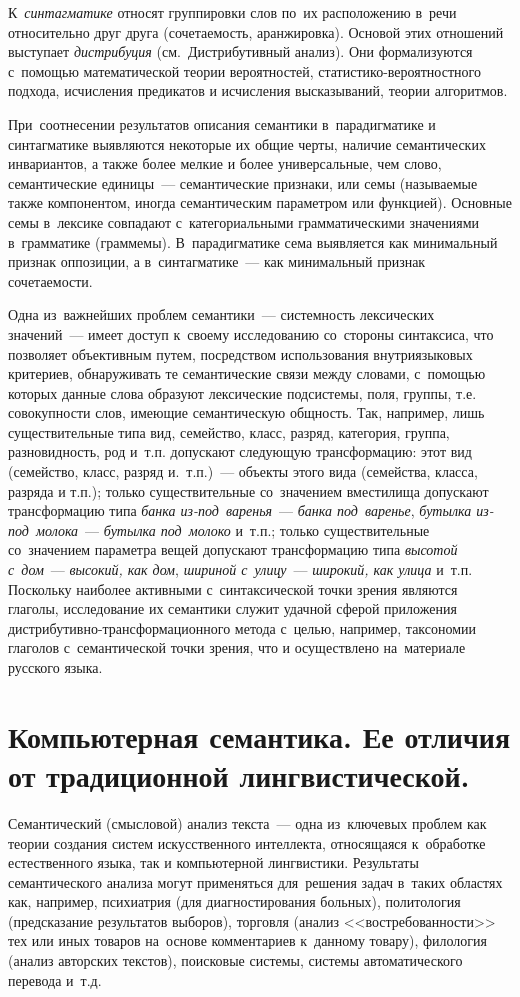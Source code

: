 \documentclass[12pt]{article}
\theoremstyle{definition}
\theoremstyle{remark}
\numberwithin{equation}{section}
\begin{document}
К~{\sl синтагматике} относят группировки слов по~их расположению в~речи 
относительно друг друга (сочетаемость, аранжировка). Основой этих отношений 
выступает {\sl дистрибуция} (см.~Дистрибутивный анализ). Они формализуются 
с~помощью математической теории вероятностей, статистико-вероятностного 
подхода, исчисления предикатов и исчисления высказываний, теории алгоритмов.

При~соотнесении результатов описания семантики в~парадигматике и синтагматике 
выявляются некоторые их общие черты, наличие семантических инвариантов, 
а также более мелкие и более универсальные, чем слово, семантические 
единицы~--- семантические признаки, или семы (называемые также компонентом, 
иногда семантическим параметром или функцией). Основные семы в~лексике совпадают 
с~категориальными грамматическими значениями в~грамматике (граммемы). 
В~парадигматике сема выявляется как минимальный признак оппозиции, 
а в~синтагматике~--- как минимальный признак сочетаемости.

Одна из~важнейших проблем семантики~--- системность лексических значений~--- 
имеет доступ к~своему исследованию со~стороны синтаксиса, что позволяет 
объективным путем, посредством использования внутриязыковых критериев, 
обнаруживать те семантические связи между словами, с~помощью которых данные 
слова образуют лексические подсистемы, поля, группы, т.е. совокупности 
слов, имеющие семантическую общность. Так, например, лишь существительные 
типа вид, семейство, класс, разряд, категория, группа, разновидность, род 
и~т.п. допускают следующую трансформацию: этот вид (семейство, класс, разряд 
и.~т.п.)~--- объекты этого вида (семейства, класса, разряда и т.п.); только 
существительные со~значением вместилища допускают трансформацию типа {\it банка 
из-под~варенья}~--- {\it банка под~варенье}, {\it бутылка из-под~молока}~--- 
{\it бутылка под~молоко} и~т.п.; только существительные со~значением параметра вещей 
допускают трансформацию типа {\it высотой с~дом}~--- {\it высокий, как дом}, 
{\it шириной с~улицу}~--- {\it широкий, как улица} и~т.п. Поскольку наиболее 
активными с~синтаксической точки зрения являются глаголы, исследование их 
семантики служит удачной сферой приложения дистрибутивно-трансформационного 
метода с~целью, например, таксономии глаголов с~семантической точки 
зрения, что и осуществлено на~материале русского языка.

\section{Компьютерная семантика. Ее отличия от традиционной лингвистической.}
Семантический (смысловой) анализ текста~--- одна из~ключевых проблем 
как теории создания систем искусственного интеллекта, относящаяся 
к~обработке естественного языка, так и компьютерной лингвистики. 
Результаты семантического анализа могут применяться для~решения задач 
в~таких областях как, например, психиатрия (для диагностирования 
больных), политология (предсказание результатов выборов), торговля 
(анализ <<востребованности>> тех или иных товаров на~основе комментариев 
к~данному товару), филология (анализ авторских текстов), поисковые 
системы, системы автоматического перевода и~т.д.
\end{document}
